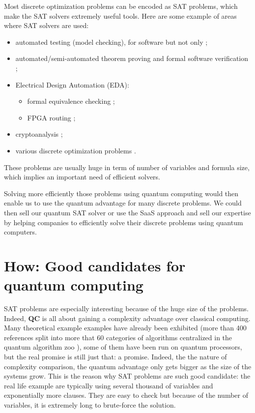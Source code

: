 \documentclass{article}
\def\QC{\textbf{QC} }
\begin{document}
Most discrete optimization problems can be encoded as SAT problems, which make
the SAT solvers extremely useful tools. Here are some example of areas where SAT
solvers are used:
\begin{itemize}
  \item automated testing (model checking), for software but not only 
    \cite{SBS96,BCCZ99};
  \item automated/semi-automated theorem proving and formal software verification
    \cite{DLL62,Sta94,BFMP11};
  \item Electrical Design Automation (EDA):
  \begin{itemize}
    \item formal equivalence checking \cite{PK00};
    \item FPGA routing \cite{NSR02};
  \end{itemize}
  \item cryptoanalysis \cite{TID20};
  \item various discrete optimization problems \cite{LAK+14}.
\end{itemize}
These problems are usually huge in term of number of variables and formula size,
which implies an important need of efficient solvers.

Solving more efficiently those problems using quantum computing would then enable
us to use the quantum advantage for many discrete problems. We could then sell
our quantum SAT solver or use the SaaS approach and sell our expertise by helping
companies to efficiently solve their discrete problems using quantum computers.

\section{How: Good candidates for quantum computing}
\label{sec:good_candidates_for_quantum_computing}

SAT problems are especially interesting because of the huge size of the problems.
Indeed, \QC is all about gaining a complexity advantage over classical computing.
Many theoretical example examples have already been exhibited (more than 400
references split into more that 60 categories of algorithms centralized in the
quantum algorithm zoo \cite{Jor21}), some of them have been run on quantum
processors, but the real promise is still just that: a promise. Indeed, the the
nature of complexity comparison, the quantum advantage only gets bigger as the
size of the systems grow. This is the reason why SAT problems are such good
candidate: the real life example are typically using several thousand of
variables and exponentially more clauses. They are easy to check but because of
the number of variables, it is extremely long to brute-force the solution.
\end{document}
